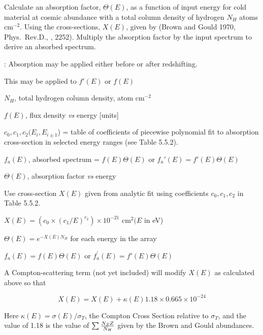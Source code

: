 {\listlist
 

Calculate an absorption factor, $\Theta (E)$, as a function of input energy
for cold material at cosmic abundance with a total column density of hydrogen
$N_H$ atoms cm$^{-2}$.  Using the cross-sections, $X(E)$, given by (Brown and 
Gould 1970, Phys.~Rev.D., , 2252).  Multiply the absorption factor by
the input spectrum to derive an absorbed spectrum.

:  Absorption may be applied either before or after redshifting.
 
This may be applied to $f'(E)$ or $f(E)$


$N_H$, total hydrogen column density, atom cm$^{-2}$

$f(E)$, flux density {\it vs} energy [units]

$c_0, c_1, c_2 (E_i, E_{i\pm1}$) = table of coefficients 
of piecewise polynomial fit to absorption cross-section in selected energy
ranges (see Table 5.5.2).
 

$f_a (E)$, absorbed spectrum = $f(E) \Theta (E)$ or $f_a'(E) = f'(E)\Theta(E)$
 
$\Theta (E)$, absorption factor {\it vs} energy
 
 
Use cross-section $X(E)$ given from analytic fit using 
coefficients $c_0, c_1, c_2$ in Table 5.5.2.

$X(E) = (c_0 \times (c_1/ E )^{c_2}) \times 10^{-21}$ cm$^{2} (E$ in eV)
 
$\Theta(E) = e^{-X(E)N_{H}}$ for each energy in the array
 
$f_{a}(E) = f(E)\Theta(E)$ or $f_{a}^{\prime}(E) = f'(E)\Theta(E)$

}

\vskip 18pt

{\listlist

A Compton-scattering term (not yet included) will modify $X(E)$ as
calculated
above so that

}

$$X(E) = X(E) + \kappa(E) 1.18 \times 0.665 \times 10^{-24}$$

\itemitem{}Here $\kappa(E) = \sigma(E)/\sigma_T$, the Compton Cross Section
relative to $\sigma_T$, and the value of 1.18 is the value of
$\sum {{N_Z Z} \over N_H}$ given by the Brown and Gould abundances.


